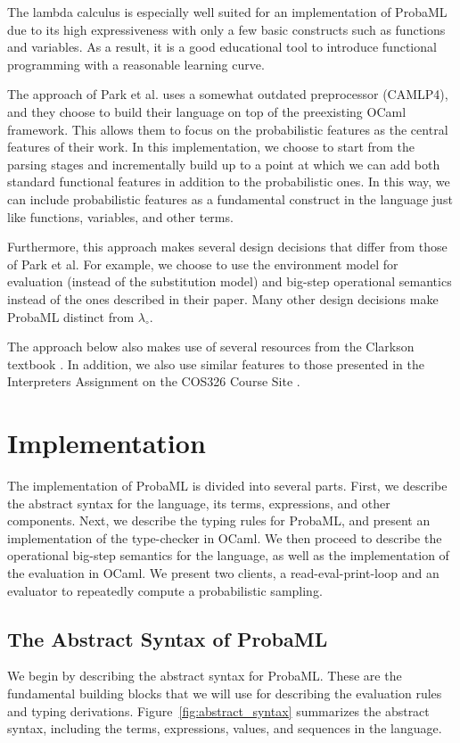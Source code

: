 \documentclass[pageno]{jpaper}
\begin{document}
The lambda calculus is especially well suited for an implementation of ProbaML due to its high expressiveness with only a few basic constructs such as functions and variables. As a result, it is a good educational tool to introduce functional programming with a reasonable learning curve.

The approach of Park et al. uses a somewhat outdated preprocessor (CAMLP4), and they choose to build their language on top of the preexisting OCaml framework. This allows them to focus on the probabilistic features as the central features of their work. In this implementation, we choose to start from the parsing stages and incrementally build up to a point at which we can add both standard functional features in addition to the probabilistic ones. In this way, we can include probabilistic features as a fundamental construct in the language just like functions, variables, and other terms.

Furthermore, this approach makes several design decisions that differ from those of Park et al. For example, we choose to use the environment model for evaluation (instead of the substitution model) and big-step operational semantics instead of the ones described in their paper. Many other design decisions make ProbaML distinct from $\lambda_{\circ}$.

The approach below also makes use of several resources from the Clarkson textbook \cite{cs3110_book}. In addition, we also use similar features to those presented in the Interpreters Assignment on the COS326 Course Site \cite{cos326_site}.

\section{Implementation}
The implementation of ProbaML is divided into several parts. First, we describe the abstract syntax for the language, its terms, expressions, and other components. Next, we describe the typing rules for ProbaML, and present an implementation of the type-checker in OCaml. We then proceed to describe the operational big-step semantics for the language, as well as the implementation of the evaluation in OCaml. We present two clients, a read-eval-print-loop and an evaluator to repeatedly compute a probabilistic sampling.

\subsection{The Abstract Syntax of ProbaML} \label{abstract_syntax_probaml}
We begin by describing the abstract syntax for ProbaML. These are the fundamental building blocks that we will use for describing the evaluation rules and typing derivations. Figure~\ref{fig:abstract_syntax} summarizes the abstract syntax, including the terms, expressions, values, and sequences in the language.
\end{document}
